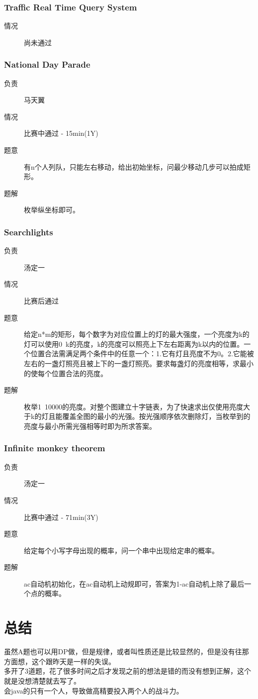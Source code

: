 \documentclass[a4paper, 11pt, nofonts, nocap, fancyhdr]{ctexart}
\newcommand{\problem}[1]{\subsubsection{#1}}
\begin{document}
\problem{Traffic Real Time Query System}

\begin{description}
\item[情况] 尚未通过
\end{description}

\problem{National Day Parade}

\begin{description}
\item[负责] 马天翼
\item[情况] 比赛中通过 - 15min(1Y)
\item[题意]
有n个人列队，只能左右移动，给出初始坐标，问最少移动几步可以拍成矩形。
\item[题解]
枚举纵坐标即可。
\end{description}

\problem{Searchlights}

\begin{description}
\item[负责] 汤定一
\item[情况] 比赛后通过
\item[题意]
给定n*m的矩形，每个数字为对应位置上的灯的最大强度，一个亮度为k的灯可以使用0~k的亮度，k的亮度可以照亮上下左右距离为k以内的位置。一个位置合法需满足两个条件中的任意一个：1.它有灯且亮度不为0。2.它能被左右的一盏灯照亮且被上下的一盏灯照亮。要求每盏灯的亮度相等，求最小的使每个位置合法的亮度。
\item[题解]
枚举1~10000的亮度。对整个图建立十字链表，为了快速求出仅使用亮度大于k的灯且能覆盖全图的最小的光强。按光强顺序依次删除灯，当枚举到的亮度与最小所需光强相等时即为所求答案。
\end{description}

\problem{Infinite monkey theorem}

\begin{description}
\item[负责] 汤定一
\item[情况] 比赛中通过 - 71min(3Y)
\item[题意]
给定每个小写字母出现的概率，问一个串中出现给定串的概率。
\item[题解]
ac自动机初始化，在ac自动机上动规即可，答案为1-ac自动机上除了最后一个点的概率。
\end{description}

\section{总结}

虽然A题也可以用DP做，但是规律，或者叫性质还是比较显然的，但是没有往那方面想，这个跟昨天是一样的失误。\\
多开了3道题，花了很多时间之后才发现之前的想法是错的而没有想到正解，这个就是没想清楚就去写了。\\
会java的只有一个人，导致做高精要投入两个人的战斗力。
\end{document}
